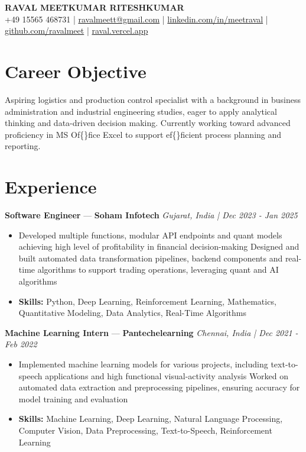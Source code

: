 \documentclass[a4paper,10pt]{article}
\begin{document}
\begin{center}
  {\Large\bfseries RAVAL MEETKUMAR RITESHKUMAR}\\[2pt]
  {\small +49 15565 468731 \;|\; \href{mailto:ravalmeett@gmail.com}{ravalmeett@gmail.com} \;|\; \href{https://www.linkedin.com/in/meetraval/}{linkedin.com/in/meetraval} \;|\; \href{https://github.com/ravalmeet}{github.com/ravalmeet} \;|\; \href{https://raval.vercel.app/}{raval.vercel.app}}
\end{center}
\vspace{-3pt}

\section*{Career Objective}
Aspiring logistics and production control specialist with a background in business administration and industrial engineering studies, eager to apply analytical thinking and data-driven decision making. Currently working toward advanced proficiency in MS Of\{\}fice Excel to support ef\{\}ficient process planning and reporting.\par

\section*{Experience}
\textbf{Software Engineer} — \textbf{Soham Infotech} \hfill \textit{Gujarat, India \;|\; Dec 2023 - Jan 2025}\par
\vspace{1pt}
\begin{itemize}
  \item Developed multiple functions, modular API endpoints and quant models achieving high level of profitability in financial decision-making Designed and built automated data transformation pipelines, backend components and real-time algorithms to support trading operations, leveraging quant and AI algorithms
  \item \textbf{Skills:} Python, Deep Learning, Reinforcement Learning, Mathematics, Quantitative Modeling, Data Analytics, Real-Time Algorithms
\end{itemize}
\vspace{3pt}
\textbf{Machine Learning Intern} — \textbf{Pantechelearning} \hfill \textit{Chennai, India \;|\; Dec 2021 - Feb 2022}\par
\vspace{1pt}
\begin{itemize}
  \item Implemented machine learning models for various projects, including text-to-speech applications and high functional visual-activity analysis Worked on automated data extraction and preprocessing pipelines, ensuring accuracy for model training and evaluation
  \item \textbf{Skills:} Machine Learning, Deep Learning, Natural Language Processing, Computer Vision, Data Preprocessing, Text-to-Speech, Reinforcement Learning
\end{itemize}
\end{document}
